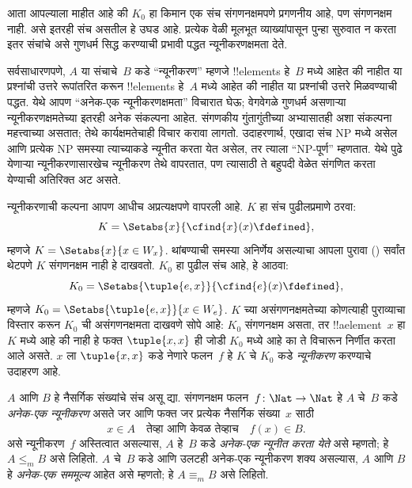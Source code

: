\documentclass[../../../include/open-logic-section]{subfiles}
\begin{document}

\begin{explain}
आता आपल्याला माहीत आहे की $K_0$ हा किमान एक संच संगणनक्षमपणे
प्रगणनीय आहे, पण संगणनक्षम नाही. असे इतरही संच असतील हे उघड
आहे. प्रत्येक वेळी मूलभूत व्याख्यांपासून पुन्हा सुरुवात न करता
इतर संचांचे असे गुणधर्म सिद्ध करण्याची प्रभावी पद्धत
न्यूनीकरणक्षमता देते.

सर्वसाधारणपणे, $A$ या संचाचे~$B$ कडे ``न्यूनीकरण'' म्हणजे
!!{element}s हे~$B$ मध्ये आहेत की नाहीत या प्रश्नांची उत्तरे
रूपांतरित करून !!{element}s हे~$A$ मध्ये आहेत की नाहीत या प्रश्नांची उत्तरे
मिळवण्याची पद्धत. येथे आपण ``अनेक-एक न्यूनीकरणक्षमता''
विचारात घेऊ; वेगवेगळे गुणधर्म असणाऱ्या न्यूनीकरणक्षमतेच्या इतरही
अनेक संकल्पना आहेत. संगणकीय गुंतागुंतीच्या अभ्यासातही अशा
संकल्पना महत्त्वाच्या असतात; तेथे कार्यक्षमतेचाही विचार करावा
लागतो. उदाहरणार्थ, एखादा संच NP मध्ये असेल आणि प्रत्येक
NP समस्या त्याच्याकडे न्यूनीत करता येत असेल, तर त्याला
``NP-पूर्ण'' म्हणतात. येथे पुढे येणाऱ्या न्यूनीकरणासारखेच
न्यूनीकरण तेथे वापरतात, पण त्यासाठी ते बहुपदी वेळेत संगणित
करता येण्याची अतिरिक्त अट असते.

न्यूनीकरणाची कल्पना आपण आधीच अप्रत्यक्षपणे वापरली आहे.
$K$ हा संच पुढीलप्रमाणे ठरवा:
\[
K = \Setabs{x}{\cfind{x}(x) \fdefined},
\]
म्हणजे $K = \Setabs{x}{x \in W_x}$. थांबण्याची समस्या
अनिर्णेय असल्याचा आपला पुरावा ()
सर्वांत थेटपणे $K$ संगणनक्षम नाही हे दाखवतो. $K_0$ हा
पुढील संच आहे, हे आठवा:
\[
K_0 = \Setabs{\tuple{e, x}}{\cfind{e}(x) \fdefined },
\]
म्हणजे $K_0 = \Setabs{\tuple{e,x}}{x \in W_e}$.
$K$ च्या असंगणनक्षमतेच्या कोणत्याही पुराव्याचा विस्तार करून
$K_0$ ची असंगणनक्षमता दाखवणे सोपे आहे: $K_0$ संगणनक्षम असता,
तर !!a{element}~$x$ हा $K$ मध्ये आहे की नाही हे फक्त
$\tuple{x, x}$ ही जोडी $K_0$ मध्ये आहे का ते विचारून
निर्णीत करता आले असते. $x$ ला $\tuple{x, x}$ कडे नेणारे
फलन~$f$ हे $K$ चे $K_0$ कडे \emph{न्यूनीकरण} करण्याचे
उदाहरण आहे.
\end{explain}

\begin{defn}
$A$ आणि $B$ हे नैसर्गिक संख्यांचे संच असू द्या.
संगणनक्षम फलन~$f\colon \Nat \to \Nat$ हे $A$ चे~$B$
कडे \emph{अनेक-एक न्यूनीकरण} असते जर आणि फक्त जर
प्रत्येक नैसर्गिक संख्या~$x$ साठी
\[
x \in A \quad \text{तेव्हा आणि केवळ तेव्हाच} \quad f(x) \in B.
\]
असे न्यूनीकरण~$f$ अस्तित्वात असल्यास, $A$ हे~$B$ कडे
\emph{अनेक-एक न्यूनीत करता येते} असे म्हणतो; हे
$A \leq_m B$ असे लिहितो. $A$ चे~$B$ कडे आणि उलटही
अनेक-एक न्यूनीकरण शक्य असल्यास, $A$ आणि $B$ हे
\emph{अनेक-एक सममूल्य} आहेत असे म्हणतो; हे
$A \equiv_m B$ असे लिहितो.
\end{defn}
\end{document}
